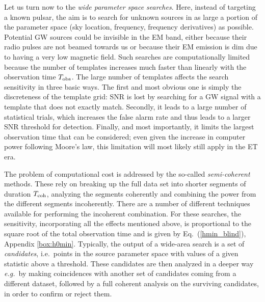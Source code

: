 Let us turn now to the \emph{wide parameter space searches}. Here, instead of
targeting a known pulsar, the aim is to search for unknown sources in as large 
a portion of the parameter space (sky location, frequency, frequency derivatives) 
as possible.  Potential GW sources could be invisible in the EM band, either
because their radio pulses are not beamed towards us or because their
EM emission is dim due to having a very low magnetic field.
Such searches are computationally limited because the
number of templates increases much faster than linearly with the
observation time $T_{\rm obs}$.  The large number of templates affects the
search sensitivity in three basic ways. The first and most obvious one
is simply the discreteness of the template grid: SNR is lost by searching
for a GW signal with a template that does not exactly match. Secondly, it
leads to a large number of statistical trials, which increases the
false alarm rate and thus leads to a larger 
SNR threshold for detection.
Finally, and most importantly, it limits the largest observation time
that can be considered; even given the increase in computer power
following Moore's law, this limitation will most likely still apply in the ET
era.

The problem of computational cost is addressed by the so-called
\emph{semi-coherent} methods. These rely on breaking up the full data
set into shorter segments of duration $T_{\rm coh}$, analyzing the segments coherently and
combining the power from the different segments incoherently. There
are a number of different techniques available for performing the
incoherent combination. %
For these searches, the sensitivity, incorporating all the effects mentioned 
above, is proportional to the square root of the total observation time and 
is given by Eq.~(\ref{hmin_blind}), Appendix \ref{box:h0min}. Typically, the output of a wide-area search 
is a set of \emph{candidates}, i.e.\ points in the source parameter space with 
values of a given statistic above a threshold. These candidates are then 
analyzed in a deeper way \emph{e.g.}\ by making coincidences with another set 
of candidates coming from a different dataset, followed by a full coherent 
analysis on the surviving candidates, in order to confirm or reject them.

